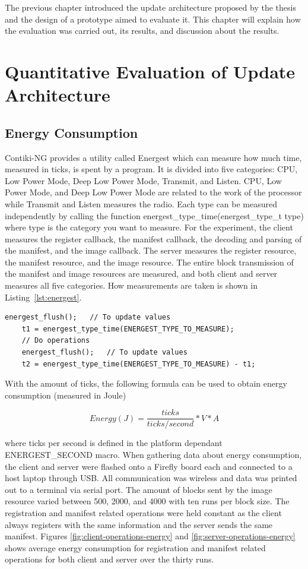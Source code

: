 \documentclass[0-thesis.tex]{subfiles}
\begin{document}
The previous chapter introduced the update architecture proposed by the thesis and the
design of a prototype aimed to evaluate it. This chapter will explain how the evaluation
was carried out, its results, and discussion about the results.

\section{Quantitative Evaluation of Update Architecture}
\label{sec:quant-evaluation}


\subsection{Energy Consumption}
\label{ssec:energy-consumption}
Contiki-NG provides a utility called Energest which can measure how much time, measured in
ticks, is spent by a program. It is divided into five categories: CPU, Low Power Mode,
Deep Low Power Mode, Transmit, and Listen. CPU, Low Power Mode, and Deep Low Power Mode
are related to the work of the processor while Transmit and Listen measures the radio.
Each type can be measured independently by calling the function
energest\_type\_time(energest\_type\_t type) where type is the category you want to
measure. For the experiment, the client measures the register callback, the manifest
callback, the decoding and parsing of the manifest, and the image callback. The server
measures the register resource, the manifest resource, and the image resource. The entire
block transmission of the manifest and image resources are measured, and both client and
server measures all five categories. How measurements are taken is shown in
Listing~\ref{lst:energest}.

\begin{lstlisting}[language=manifest, caption={How to measure ticks in energest.}, label=lst:energest]
    energest_flush();   // To update values
    t1 = energest_type_time(ENERGEST_TYPE_TO_MEASURE);
    // Do operations
    energest_flush();   // To update values
    t2 = energest_type_time(ENERGEST_TYPE_TO_MEASURE) - t1;
\end{lstlisting}

With the amount of ticks, the following formula can be used to obtain energy consumption
(measured in Joule)

$$ Energy (J) = \frac{ticks}{ticks/second} * V * A $$

where ticks per second is defined in the platform dependant ENERGEST\_SECOND macro. When
gathering data about energy consumption, the client and server were flashed onto a Firefly
board each and connected to a host laptop through USB. All communication was wireless and
data was printed out to a terminal via serial port. The amount of blocks sent by the image
resource varied between 500, 2000, and 4000 with ten runs per block size. The registration
and manifest related operations were held constant as the client always registers with the
same information and the server sends the same manifest. Figures
\ref{fig:client-operations-energy} and \ref{fig:server-operations-energy} shows average
energy consumption for registration and manifest related operations for both client and
server over the thirty runs.
\end{document}
